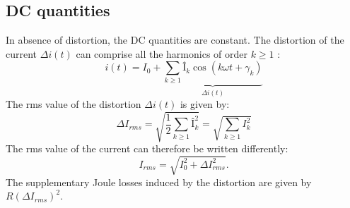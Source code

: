 	\subsection{DC quantities}
	In absence of distortion, the DC quantities are constant. The distortion of the current $\Delta i(t)$ can comprise all the harmonics of order $k\geq 1$ : 
		\begin{equation}
			i(t) = I_0 + \underbrace{\sum _{k\geq 1} Î_k \cos (k\omega t +\gamma _k)}_{\Delta i(t)}
		\end{equation}
		The rms value of the distortion $\Delta i(t)$ is given by: 
		\begin{equation}
			\Delta I_{rms} = \sqrt{\frac{1}{2}\sum _{k\geq 1} Î_k^2} = \sqrt{\sum _{k\geq 1} I_k^2}
		\end{equation}
		The rms value of the current can therefore be written differently: 
		\begin{equation}
			I_{rms} = \sqrt{I_0^2+\Delta I^2_{rms}}.
		\end{equation}
		The supplementary Joule losses induced by the distortion are given by $R(\Delta I_{rms})^2$. 
		
